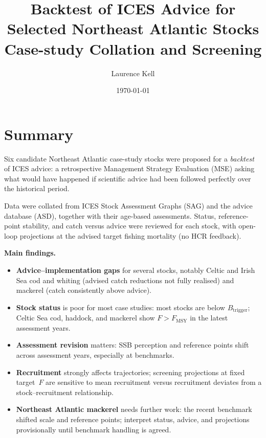 \documentclass[11pt,a4paper]{extarticle}
\title{Backtest of ICES Advice for Selected Northeast Atlantic Stocks\\
\large Case-study Collation and Screening}
\author{%
  Laurence Kell\\
}
\date{\small \today}
\begin{document}
\maketitle

{%
\setlength{\parskip}{0.35em}
\section*{Summary}

Six candidate Northeast Atlantic case-study stocks were proposed for a
\emph{backtest} of ICES advice: a retrospective Management Strategy Evaluation
(MSE) asking what would have happened if scientific advice had been followed
perfectly over the historical period.

Data were collated from ICES Stock Assessment Graphs (SAG) and the advice
database (ASD), together with their age-based assessments. Status,
reference-point stability, and catch versus advice were reviewed for each stock,
with open-loop projections at the advised target fishing mortality (no HCR
feedback).

\textbf{Main findings.}
\begin{itemize}
  \item \textbf{Advice--implementation gaps} for several stocks, notably Celtic
        and Irish Sea cod and whiting (advised catch reductions not fully
        realised) and mackerel (catch consistently above advice).
  \item \textbf{Stock status} is poor for most case studies: most stocks are
        below \(B_{\mathrm{trigger}}\); Celtic Sea cod, haddock, and mackerel
        show \(F > F_{\mathrm{MSY}}\) in the latest assessment years.
  \item \textbf{Assessment revision} matters: SSB perception and reference
        points shift across assessment years, especially at benchmarks.
  \item \textbf{Recruitment} strongly affects trajectories; screening
        projections at fixed target~\(F\) are sensitive to mean recruitment
        versus recruitment deviates from a stock--recruitment relationship.
  \item \textbf{Northeast Atlantic mackerel} needs further work: the recent
        benchmark shifted scale and reference points; interpret status, advice,
        and projections provisionally until benchmark handling is agreed.
\end{itemize}

}
\end{document}

